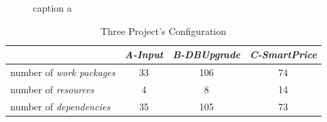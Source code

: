 \begin{figure}[!ht]
  \centering
  \caption{caption a}
  \label{fig:dag}
\end{figure}



\begin{table}[!h]
  \centering
  \caption{Three Project's Configuration}
  \label{tab:statis}
  \begin{tabular}{lccc}
    \hline
      & \emph{ A-Input } & \emph{ B-DBUpgrade } & \emph{ C-SmartPrice } \\
    \hline
    number of \emph{work packages} & 33 & 106 & 74 \\
    number of \emph{resources}     & 4  & 8   & 14 \\
    number of \emph{dependencies}  & 35 & 105 & 73 \\
    \hline
  \end{tabular}
\end{table}


